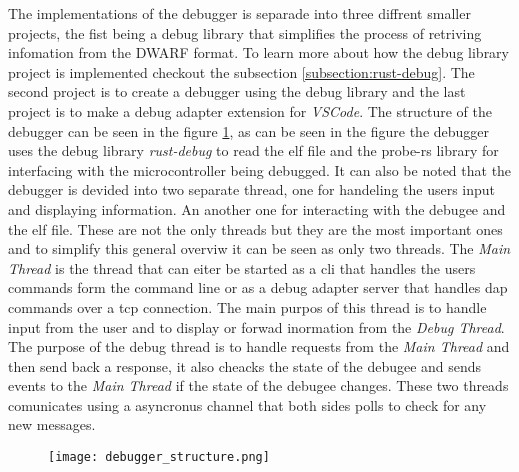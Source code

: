  

The implementations of the debugger is separade into three diffrent smaller projects, the fist being a debug library that simplifies the process of retriving infomation from the \gls{DWARF} format.
To learn more about how the debug library project is implemented checkout the subsection \ref{subsection:rust-debug}.
The second project is to create a debugger using the debug library and the last project is to make a debug adapter extension for \emph{VSCode}.
The structure of the debugger can be seen in the figure \ref{fig:EDBStruct}, as can be seen in the figure the debugger uses the debug library \emph{rust-debug} to read the \gls{elf} file and the probe-rs library for interfacing with the microcontroller being debugged.
It can also be noted that the debugger is devided into two separate thread, one for handeling the users input and displaying information.
An another one for interacting with the \gls{debugee} and the \gls{elf} file.
These are not the only threads but they are the most important ones and to simplify this general overviw it can be seen as only two threads.
The \emph{Main Thread} is the thread that can eiter be started as a cli that handles the users commands form the command line or as a debug adapter server that handles \acrshort{dap} commands over a \gls{tcp} connection.
The main purpos of this thread is to handle input from the user and to display or forwad inormation from the \emph{Debug Thread}.
The purpose of the debug thread is to handle requests from the \emph{Main Thread} and then send back a response, it also cheacks the state of the \gls{debugee} and sends events to the \emph{Main Thread} if the state of the debugee changes.
These two threads comunicates using a asyncronus channel that both sides polls to check for any new messages.


\begin{figure}[h]
    \centering
    \texttt{[image: debugger\_structure.png]}
    \label{fig:EDBStruct}
\end{figure}


